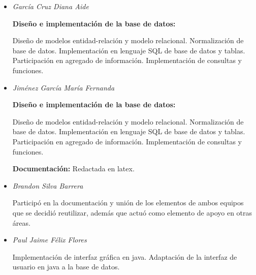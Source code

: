\documentclass[30pt,fleqn]{article}
\begin{document}
\begin{itemize}
\item \textit{García Cruz Diana Aide} 

\vspace{5mm} %

\textbf{Diseño e implementación de la base de datos:}

Diseño de modelos entidad-relación y modelo relacional.
Normalización de base de datos.
Implementación en lenguaje SQL de base de datos y tablas.
Participación en agregado de información.
Implementación de consultas y funciones.

\vspace{5mm} %

\item \textit{Jiménez García María Fernanda} 

\vspace{5mm} %

\textbf{Diseño e implementación de la base de datos:}

Diseño de modelos entidad-relación y modelo relacional.
Normalización de base de datos.
Implementación en lenguaje SQL de base de datos y tablas.
Participación en agregado de información.
Implementación de consultas y funciones.

\textbf{Documentación:}
Redactada en latex.

\vspace{5mm} %

\item \textit{Brandon Silva Barrera} 

\vspace{5mm} %

Participó en la documentación y unión de los elementos de ambos equipos que se decidió reutilizar, además que actuó como elemento de apoyo en otras áreas. 

\vspace{5mm} %

\item \textit{Paul Jaime Félix Flores} 
\vspace{5mm} %

Implementación de interfaz gráfica en java.
Adaptación de la interfaz de usuario en java a la base de datos.


\end{itemize}
\end{document}
